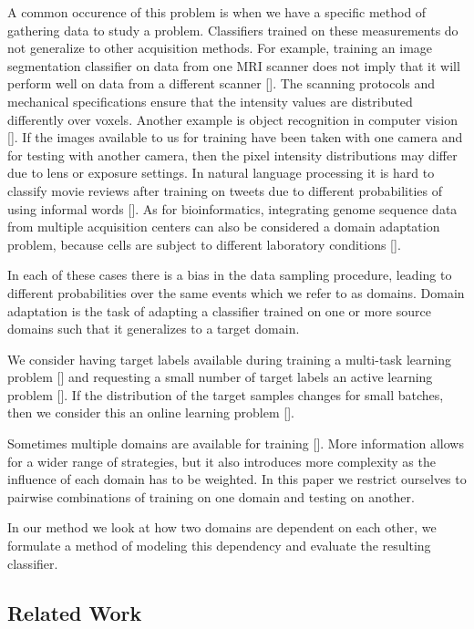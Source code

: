 \documentclass[twoside,11pt]{article}
\begin{document}
A common occurence of this problem is when we have a specific method of gathering data to study a problem. Classifiers trained on these measurements do not generalize to other acquisition methods. For example, training an image segmentation classifier on data from one MRI scanner does not imply that it will perform well on data from a different scanner  [\cite{van2013transfer}]. The scanning protocols and mechanical specifications ensure that the intensity values are distributed differently over voxels.
Another example is object recognition in computer vision [\cite{saenko2010adapting}]. If the images available to us for training have been taken with one camera and for testing with another camera, then the pixel intensity distributions may differ due to lens or exposure settings.
In natural language processing it is hard to classify movie reviews after training on tweets due to different probabilities of using informal words [\cite{peddinti2011domain}]. As for bioinformatics, integrating genome sequence data from multiple acquisition centers can also be considered a domain adaptation problem, because cells are subject to different laboratory conditions [\cite{borgwardt2006integrating}]. 

In each of these cases there is a bias in the data sampling procedure, leading to different probabilities over the same events which we refer to as domains. Domain adaptation is the task of adapting a classifier trained on one or more source domains such that it generalizes to a target domain. 

We consider having target labels available during training a multi-task learning problem [\cite{pan2010survey, moreno2012unifying}] and requesting a small number of target labels an active learning problem [\cite{cohn1996active}]. If the distribution of the target samples changes for small batches, then we consider this an online learning problem [\cite{ma2009identifying}]. 

Sometimes multiple domains are available for training [\cite{mansour2009domaina}]. More information allows for a wider range of strategies, but it also introduces more complexity as the influence of each domain has to be weighted. In this paper we restrict ourselves to pairwise combinations of training on one domain and testing on another.

In our method we look at how two domains are dependent on each other, we formulate a method of modeling this dependency and evaluate the resulting classifier.

\subsection{Related Work}
\end{document}
